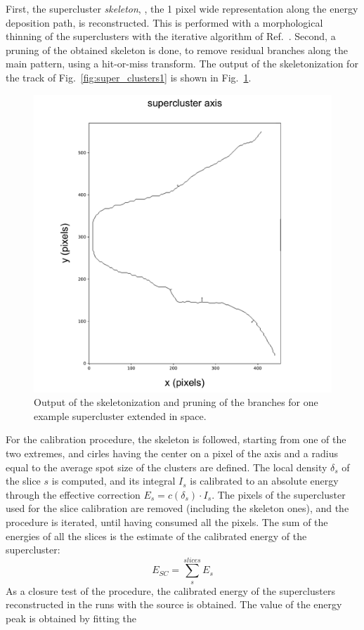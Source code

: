 First, the supercluster \textit{skeleton}, \ie, the 1 pixel wide
representation along the energy deposition path, is reconstructed.
This is performed with a morphological thinning of the superclusters
with the iterative algorithm of Ref.~\cite{thin1,thin2}.  Second, a
pruning of the obtained skeleton is done, to remove residual branches
along the main pattern, using a hit-or-miss transform.  The output of
the skeletonization for the track of Fig.~\ref{fig:super_clusters1} is
shown in Fig.~\ref{fig:skeleton}.
%
\begin{figure}[ht]
  \begin{center}
     \includegraphics[width=0.49\linewidth]{figures/skeleton_paper}
     \caption{Output of the skeletonization and pruning of the
       branches for one example supercluster extended in
       space.  \label{fig:skeleton}}
  \end{center}
\end{figure}
%
For the calibration procedure, the skeleton is followed, starting from
one of the two extremes, and cirles having the center on a pixel of
the axis and a radius equal to the average spot size of the \fe
clusters are defined. The local density $\delta_s$ of the slice $s$ is
computed, and its integral $I_s$ is calibrated to an absolute energy
through the effective correction $E_s=c(\delta_s)\cdot I_s$. The
pixels of the supercluster used for the slice calibration are removed
(including the skeleton ones), and the procedure is iterated, until
having consumed all the pixels. The sum of the energies of all the
slices is the estimate of the calibrated energy of the supercluster:
%
\begin{equation}
  \label{eq:ecal}
  E_{SC} = \sum_s^{slices} E_s
\end{equation}
%
As a closure test of the procedure, the calibrated energy of the
superclusters reconstructed in the runs with the \fe source is
obtained.  The value of the energy peak is obtained by fitting the
